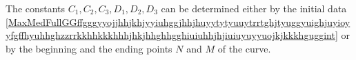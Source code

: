 \documentclass{article}
\theoremstyle{definition}
\theoremstyle{remark}
\renewcommand{\vec}[1]{\mathbf{#1}}
\newcommand{\er}{\eqref}
\newcommand{\er}{\eqref}
\begin{document}
%
%
%
\begin{comment} Moreover, by
\er{MaxMedFullGGffgggyyojjhhjkhjyyiuhggjhhjhuyytytyuuytrrtghjtyuggyuighjuyioyyfgffhyuhhghzzrrkkhhkkkhhhjhkjhhghhgghiuiuhhjhjiuiuyuyyukkl}
the radius of curvature of the curve satisfies:
\begin{equation}\label{MaxMedFullGGffgggyyojjhhjkhjyyiuhggjhhjhuyytytyuuytrrtghjtyuggyuighjuyioyyfgffhyuhhghzzrrkkhhkkkhhhjhkjhhghhgghiuiuhhjhjiuiuyuyyukklklihi}
R:=\frac{1}{\left|\frac{d^2\vec
r}{d\lambda^2}\right|}=\frac{c}{2w}\sqrt{\frac{\kappa_0}{\gamma_0}}\frac{1}{C^2_1+C^2_2}\,.
\end{equation}
\end{comment}
%
%
%
The constants $C_1,C_2,C_3,D_1,D_2,D_3$ can be determined either by
the initial data
\er{MaxMedFullGGffgggyyojjhhjkhjyyiuhggjhhjhuyytytyuuytrrtghjtyuggyuighjuyioyyfgffhyuhhghzzrrkkhhkkkhhhjhkjhhghhgghiuiuhhjhjiuiuyuyyuojkjkkkhguggint}
or by the beginning and the ending points $N$ and $M$ of the curve.
%
%
%
%
\begin{comment}
Consider the coordinates of the endpoints of the curve as
$N=(N_1,N_2,N_3)$ and $M=(M_1,M_2,M_3)$. Then for $\lambda=0$ we
must have $(x,y,z)=N$ i.e.
\begin{equation}\label{MaxMedFullGGffgggyyojjhhjkhjyyiuhggjhhjhuyytytyuuytrrtghjtyuggyuighjuyioyyfgffhyuhhghzzrrkkhhkkkhhhjhkjhhghhgghiuiuhhjhjiuiuyuyyuojkjkkkh}
\begin{cases}
D_1=N_1\\
D_2=N_2,\\
D_3=N_3.
\end{cases}
\end{equation}
Moreover we must have
\er{MaxMedFullGGffgggyyojjhhjkhjyyiuhggjhhjhuyytytyuuytrrtghjtyuggyuighjuyioyyfgffhyuhhghzzrrkkhhkkkhhhjhkjhhghhgghiuiuhhjhjiuiuyuyyuojk}.
Finally there must exist $\lambda_0>0$, which turns to be the length
of the curve, such that
\begin{equation}\label{MaxMedFullGGffgggyyojjhhjkhjyyiuhggjhhjhuyytytyuuytrrtghjtyuggyuighjuyioyyfgffhyuhhghzzrrkkhhkkkhhhjhkjhhghhgghiuiuhhjhjiuiuyuyyukklghhghyhjhjh}
\begin{cases}
M_1=C_1\frac{c}{2w}\sqrt{\frac{\kappa_0}{\gamma_0}}\left(\cos{\left(\frac{2w}{c}\sqrt{\frac{\gamma_0}{\kappa_0}}\lambda_0\right)}-1\right)+C_2\frac{c}{2w}\sqrt{\frac{\kappa_0}{\gamma_0}}\sin{\left(\frac{2w}{c}\sqrt{\frac{\gamma_0}{\kappa_0}}\lambda_0\right)}+D_1
\\
M_2=-C_1\frac{c}{2w}\sqrt{\frac{\kappa_0}{\gamma_0}}\sin{\left(\frac{2w}{c}\sqrt{\frac{\gamma_0}{\kappa_0}}\lambda_0\right)}+C_2\frac{c}{2w}\sqrt{\frac{\kappa_0}{\gamma_0}}\left(\cos{\left(\frac{2w}{c}\sqrt{\frac{\gamma_0}{\kappa_0}}\lambda_0\right)}-1\right)+D_2
\\
M_3=C_3\lambda_0+D_3.
\end{cases}
\end{equation}
\end{comment}
\end{document}
